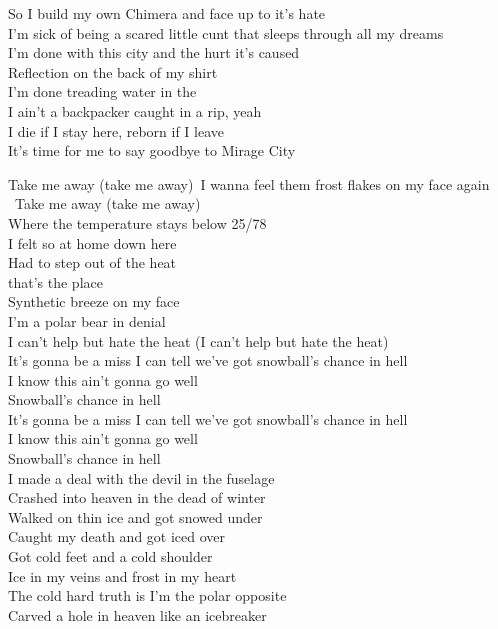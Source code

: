 So I build my own Chimera and face up to it's hate\\
I'm sick of being a scared little cunt that sleeps through all my dreams\\
I'm done with this city and the hurt it's caused\\
Reflection on the back of my shirt\\
I'm done treading water in the \\
I ain't a backpacker caught in a rip, yeah\\
I die if I stay here, reborn if I leave\\
It's time for me to say goodbye to Mirage City\\



Take me away (take me away)\
I wanna feel them frost flakes on my face again\\\
Take me away (take me away)\\
Where the temperature stays below 25/78\\

I felt so at home down here\\
Had to step out of the heat\\
 that's the place\\
Synthetic breeze on my face\\
I'm a polar bear in denial\\
I can't help but hate the heat (I can't help but hate the heat)\\

It's gonna be a miss I can tell we've got snowball's chance in hell\\
I know this ain't gonna go well\\
Snowball's chance in hell\\
It's gonna be a miss I can tell we've got snowball's chance in hell\\
I know this ain't gonna go well\\
Snowball's chance in hell\\

I made a deal with the devil in the fuselage\\
Crashed into heaven in the dead of winter\\
Walked on thin ice and got snowed under\\
Caught my death and got iced over\\
Got cold feet and a cold shoulder\\
Ice in my veins and frost in my heart\\
The cold hard truth is I'm the polar opposite\\
Carved a hole in heaven like an icebreaker\\

